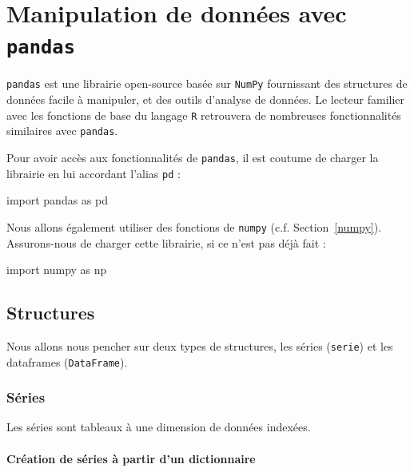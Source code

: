 \documentclass[12pt,]{book}
\newenvironment{Shaded}{\begin{snugshade}}{\end{snugshade}}
\newcommand{\ImportTok}[1]{#1}
\newcommand{\NormalTok}[1]{#1}
\numberwithin{equation}{section}
\numberwithin{countremarque}{section}
\begin{document}
\chapter{\texorpdfstring{Manipulation de données avec
\texttt{pandas}}{Manipulation de données avec pandas}}\label{pandas}

\texttt{pandas} est une librairie open-source basée sur \texttt{NumPy}
fournissant des structures de données facile à manipuler, et des outils
d'analyse de données. Le lecteur familier avec les fonctions de base du
langage \texttt{R} retrouvera de nombreuses fonctionnalités similaires
avec \texttt{pandas}.

Pour avoir accès aux fonctionnalités de \texttt{pandas}, il est coutume
de charger la librairie en lui accordant l'alias \texttt{pd} :

\begin{Shaded}
\begin{Highlighting}[]
\ImportTok{import}\NormalTok{ pandas }\ImportTok{as}\NormalTok{ pd}
\end{Highlighting}
\end{Shaded}

Nous allons également utiliser des fonctions de \texttt{numpy} (c.f.
Section~\ref{numpy}). Assurons-nous de charger cette librairie, si ce
n'est pas déjà fait :

\begin{Shaded}
\begin{Highlighting}[]
\ImportTok{import}\NormalTok{ numpy }\ImportTok{as}\NormalTok{ np}
\end{Highlighting}
\end{Shaded}

\section{Structures}\label{structures-1}

Nous allons nous pencher sur deux types de structures, les séries
(\texttt{serie}) et les dataframes (\texttt{DataFrame}).

\subsection{Séries}\label{series}

Les séries sont tableaux à une dimension de données indexées.

\subsubsection{Création de séries à partir d'un
dictionnaire}\label{creation-de-series-a-partir-dun-dictionnaire}
\end{document}
